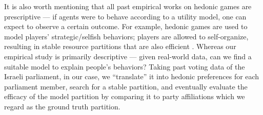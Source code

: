It is also worth mentioning that all past empirical works on hedonic games are 
prescriptive --- if agents were to behave according to a utility model, one can
expect to observe a certain outcome.
For example, hedonic games are used to model players' strategic/selfish behaviors;
players are allowed to self-organize, resulting in stable resource partitions that
are also efficient \cite{5674046, 5137409, 6846512}.
Whereas our empirical study is primarily descriptive --- given real-world data,
can we find a suitable model to explain people's behaviors?
Taking past voting data of the Israeli parliament, in our case, we ``translate''
it into hedonic preferences for each parliament member, search for a stable
partition, and eventually evaluate the efficacy of the model partition by
comparing it to party affiliations which we regard as the ground truth partition.
